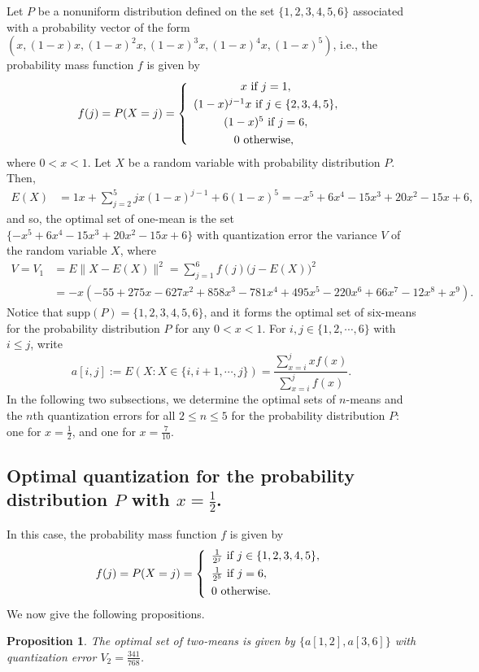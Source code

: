 \documentclass[12pt, reqno]{amsart}
\theoremstyle{plain}
\newtheorem{prop}[subsection]{Proposition}
\theoremstyle{definition}
\newcommand{\set}[1]{\{#1\}}%
\newcommand{\te}{\text}%
\begin{document}
Let $P$ be a nonuniform distribution defined on the set $\set{1, 2, 3, 4, 5, 6}$ associated with a probability vector of the form $(x, (1 - x) x, (1 - x)^2 x, (1 - x)^3 x, (1 - x)^4 x, (1 - x)^5)$, i.e., the probability mass function $f$ is given by
\[f(j)=P(X=j)=\left\{\begin{array} {cc} 
 \vspace{0.05 in} 
x \te{ if } j=1,\\  
 \vspace{0.05 in} 
(1-x)^{j-1}x \te{ if } j\in \set{ 2, 3, 4, 5}, \\  
 \vspace{0.05 in} 
(1-x)^{5} \te { if } j=6,\\
0 \te{ otherwise, }
\end{array}
\right.
 \]
 where $0<x<1$.  Let $X$ be a random variable with probability distribution $P$. Then,
\begin{align*}
E(X)& =1 x+\sum _{j=2}^5 j x (1-x)^{j-1}+6 (1-x)^5=-x^5+6 x^4-15 x^3+20 x^2-15 x+6,
\end{align*}
and so, the optimal set of one-mean is the set $\set{-x^5+6 x^4-15 x^3+20 x^2-15 x+6}$ with quantization error the variance $V$ of the random variable $X$, where
\begin{align*}
V=V_1&=E\|X-E(X)\|^2=\sum_{j=1}^6 f(j)\Big(j-E(X)\Big)^2\\
&= -x (-55 + 275 x - 627 x^2 + 858 x^3 - 781 x^4 + 495 x^5 - 220 x^6 +
   66 x^7 - 12 x^8 + x^9).
   \end{align*}
 Notice that supp$(P)=\set{1, 2, 3, 4, 5, 6}$, and it forms the optimal set of six-means for the probability distribution $P$ for any $0<x<1$.
 For $i, j\in \set{1, 2, \cdots, 6}$ with $i\leq j$, write \[a[i, j]:=E(X : X \in \set{i, i+1, \cdots, j})=\frac {\sum_{x=i}^j xf(x)}{\sum_{x=i}^j  f(x)}.\]
 In the following two subsections, we determine the optimal sets of $n$-means and the $n$th quantization errors for all $2\leq n\leq 5$ for the probability distribution $P$: one for $x=\frac 12$, and one for $x=\frac 7{10}$.



\subsection{Optimal quantization for the probability distribution $P$ with $x=\frac 12$.}
In this case, the probability mass function $f$ is given by
\[f(j)=P(X=j)=\left\{\begin{array} {ll}\vspace{0.05 in}
\frac 1{2^j} \te{ if } j\in \set{1, 2, 3, 4, 5}, \\
 \vspace{0.05in} 
\frac 1 {2^5} \te { if } j=6,\\
0 \te{ otherwise. }
\end{array}
\right.
 \]
 We now give the following propositions.
\begin{prop} \label{prop12}
The optimal set of two-means is given by $\set{a[1,2], a[3, 6]}$ with quantization error $V_2=\frac{341}{768}$.
\end{prop}
\end{document}
